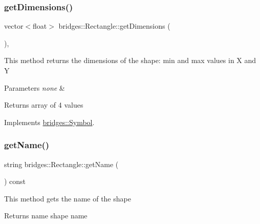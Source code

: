 \subsubsection{\texorpdfstring{get\+Dimensions()}{getDimensions()}}
{\footnotesize\ttfamily vector$<$float$>$ bridges\+::\+Rectangle\+::get\+Dimensions (\begin{DoxyParamCaption}{ }\end{DoxyParamCaption})\hspace{0.3cm}{\ttfamily [inline]}, {\ttfamily [virtual]}}

This method returns the dimensions of the shape\+: min and max values in X and Y


\begin{DoxyParams}{Parameters}
{\em none} & \\
\hline
\end{DoxyParams}
\begin{DoxyReturn}{Returns}
array of 4 values 
\end{DoxyReturn}


Implements \mbox{\hyperlink{classbridges_1_1_symbol_a6eb190dc71b31b344b7610a07c6dc1d5}{bridges\+::\+Symbol}}.

\mbox{\label{classbridges_1_1_rectangle_a78d234b0cb0e7263f2380b3a5f454178}} 
\subsubsection{\texorpdfstring{get\+Name()}{getName()}}
{\footnotesize\ttfamily string bridges\+::\+Rectangle\+::get\+Name (\begin{DoxyParamCaption}{ }\end{DoxyParamCaption}) const\hspace{0.3cm}{\ttfamily [inline]}}

This method gets the name of the shape

\begin{DoxyReturn}{Returns}
name shape name 
\end{DoxyReturn}
\mbox{\label{classbridges_1_1_rectangle_a509c9489c6f145b684447851736acac5}} 
